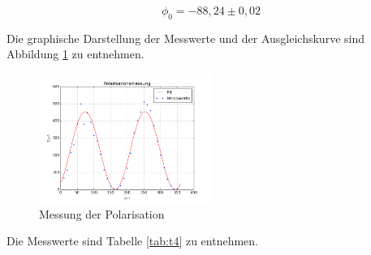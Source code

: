 \begin{equation*}
\phi_0=-88,24\pm0,02
\end{equation*}

\noindent Die graphische Darstellung der Messwerte und der Ausgleichskurve sind Abbildung \ref{fig:pol} zu entnehmen.

\begin{figure}[H]
	\centering
	\includegraphics[width=0.5\textwidth]{plots/pol}
	\caption{Messung der Polarisation}
	\label{fig:pol}
\end{figure}

\noindent Die Messwerte sind Tabelle \ref{tab:t4} zu entnehmen.

